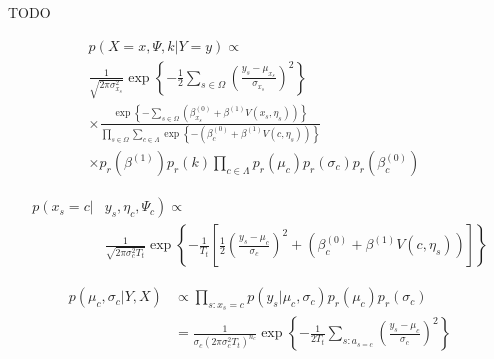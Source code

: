 \documentclass[10pt,letterpaper]{article}
\begin{document}
TODO

\begin{equation}
\begin{aligned}
p(X=x, \Psi, k | Y=y) \propto & \\
\frac{1}{\sqrt{2 \pi \sigma_{x_{s}}^{2}}} \exp \left\{-\frac{1}{2} \sum_{s \in \Omega}\left(\frac{y_{s}-\mu_{x_{s}}}{\sigma_{x_{s}}}\right)^{2}\right\} \\
\times \frac{\exp \left\{-\sum_{s \in \Omega}\left(\beta_{x_{s}}^{(0)}+\beta^{(1)} V\left(x_{s}, \eta_{s}\right)\right)\right\}}{\prod_{s \in \Omega} \sum_{c \in \Lambda} \exp \left\{-\left(\beta_{c}^{(0)}+\beta^{(1)} V\left(c, \eta_{s}\right)\right)\right\}} \\
\times p_{r}\left(\beta^{(1)}\right) p_{r}(k) \prod_{c \in \Lambda} p_{r}\left(\mu_{c}\right) p_{r}\left(\sigma_{c}\right) p_{r}\left(\beta_{c}^{(0)}\right)
\end{aligned}
\end{equation}


\begin{equation}
\begin{aligned}
p\left(x_{s}=c |\right.&\left.y_{s}, \eta_{c}, \Psi_{c}\right) \propto \\
& \frac{1}{\sqrt{2 \pi \sigma_{c}^{2} T_{t}}} \exp \left\{-\frac{1}{T_{t}}\left[\frac{1}{2}\left(\frac{y_{s}-\mu_{c}}{\sigma_{c}}\right)^{2}+\left(\beta_{c}^{(0)}+\beta^{(1)} V\left(c, \eta_{s}\right)\right)\right]\right\}
\end{aligned}
\end{equation}



\begin{equation}
\begin{aligned}
p\left(\mu_{c}, \sigma_{c} | Y, X\right) & \propto \prod_{s: x_{s}=c} p\left(y_{s} | \mu_{c}, \sigma_{c}\right) p_{r}\left(\mu_{c}\right) p_{r}\left(\sigma_{c}\right) \\
&=\frac{1}{\sigma_{c}\left(2 \pi \sigma_{c}^{2} T_{t}\right)^{n_{c}}} \exp \left\{-\frac{1}{2 T_{t}} \sum_{s: a_{s=c}}\left(\frac{y_{s}-\mu_{c}}{\sigma_{c}}\right)^{2}\right\}
\end{aligned}
\end{equation}
\end{document}
